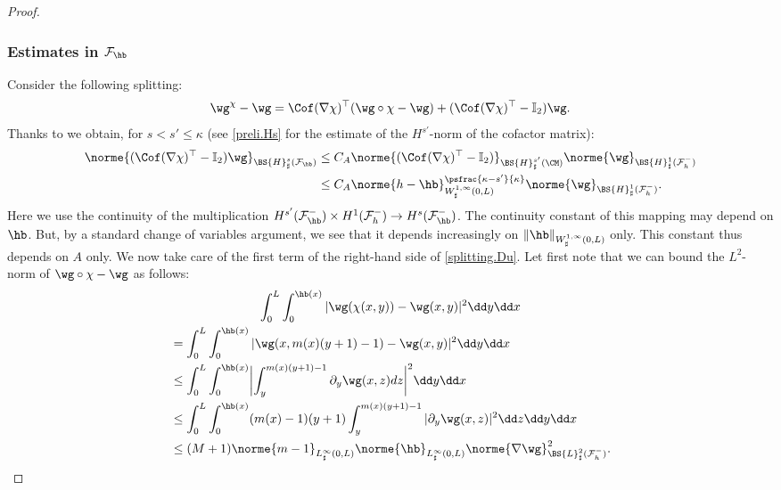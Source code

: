 \begin{proof}
\subsubsection*{Estimates in $\mathcal{F}_{\hb}$}
Consider the following splitting:
\begin{equation}\label{splitting.Du}
\wg^\chi - \wg = \Cof(\nabla\chi)^{\top}(\wg\circ\chi - \wg) +(\Cof(\nabla\chi)^{\top}-\mathbb I_2)\wg.
\end{equation}
Thanks to \cite[Prop.\,B.1]{Grubsolo} we obtain, for $s<s'\leq \kappa$ (see \eqref{preli.Hs} for the estimate of the $H^{s'}$-norm of the cofactor matrix):
\[
\begin{aligned}
\norme{(\Cof(\nabla\chi)^{\top}-\mathbb I_2)\wg}_{ \BS{H}^{s}_{\sharp}(\mathcal{F}_{\hb})}&\leq C_{A} \norme{(\Cof(\nabla\chi)^{\top}-\mathbb I_2)}_{ \BS{H}^{s'}_{\sharp}(\CM)}\norme{\wg}_{\BS{H}^{1}_{\sharp}(\mathcal{F}^{-}_{h})}\\
&\leq C_A \norme{h-\hb}_{W^{1,\infty}_{\sharp}(0,L)}^{\psfrac{\kappa-s'}{\kappa}}\norme{\wg}_{\BS{H}^{1}_{\sharp}(\mathcal{F}^{-}_{h})}.
\end{aligned}
\]
Here we use the continuity of the
multiplication
$H^{s'}(\mathcal F^{-}_{\hb}) \times H^{1}(\mathcal F^{-}_{h}) \to
H^{s}(\mathcal F^{-}_{\hb})$. The continuity constant of this mapping
may depend on $\hb$. But, by a standard change of variables argument, we see that it depends increasingly on $\|\hb\|_{W^{1,\infty}_{\sharp}(0,L)}$ only. This constant thus depends on $A$ only.
We now take care of the first term of the right-hand side of \eqref{splitting.Du}.
Let first note that we can bound the $L^2$-norm of $\wg \circ \chi - \wg$ as follows:
\begin{multline*}
\int_{0}^{L}\int_{0}^{\hb(x)}\vert\wg(\chi(x,y)) - \wg(x,y)\vert^{2}\dd y\dd x
\\
\begin{aligned}
& =\int_{0}^{L}\int_{0}^{\hb(x)}\vert \wg(x,m(x)(y+1)-1)-\wg(x,y)\vert^{2}\dd y\dd x\\
&\leq \int_{0}^{L}\int_{0}^{\hb(x)}\biggl\vert \int_{y}^{m(x)(y+1)-1}\partial_y\wg(x,z)dz\biggr\vert^{2}\dd y\dd x\\
&\leq \int_{0}^{L}\int_{0}^{\hb(x)}(m(x)-1)(y+1)\int_{y}^{m(x)(y+1)-1}\vert \partial_y\wg(x,z)\vert^{2}\dd z\dd y\dd x\\
&\leq (M+1)\norme{m-1}_{L^{\infty}_{\sharp}(0,L)}\norme{\hb}_{L^{\infty}_{\sharp}(0,L)}\norme{\nabla\wg}_{\BS{L}^{2}_{\sharp}(\mathcal{F}^{-}_{h})}^{2}.
\end{aligned}
\end{multline*}

\end{proof}
